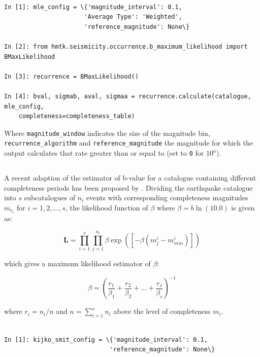 \begin{Verbatim}[frame=single, commandchars=\\\{\}, fontsize=\scriptsize]

In [1]: mle_config = \{'magnitude_interval': 0.1,
                      'Average Type': 'Weighted',
                      'reference_magnitude': None\}

In [2]: from hmtk.seismicity.occurrence.b_maximum_likelihood import BMaxLikelihood

In [3]: recurrence = BMaxLikelihood()

In [4]: bval, sigmab, aval, sigmaa = recurrence.calculate(catalogue, mle_config, 
    completeness=completeness_table)

\end{Verbatim}

Where \verb=magnitude_window= indicates the size of the magnitude bin, \verb=recurrence_algorithm= and \verb=reference_magnitude= the magnitude for which the output calculates that rate greater than or equal to (set to \verb=0= for $10^{a}$). 

\subsection{\cite{KijkoSmit2012}}

A recent adaption of the \cite{Aki1965} estimator of b-value for  a catalogue containing different completeness periods has been proposed by \cite{KijkoSmit2012}. Dividing the earthquake catalogue into $s$ subcatalogues of $n_i$ events with corresponding completeness magnitudes $m_{c_i}$ for $i = 1, 2, ..., s$, the likelihood function of $\beta$ where $\beta = b \ln		 \left( {10.0} \right)$ is given as:

\begin{equation}
    \mathbf{L} = \prod_{i = 1}^{s} \prod_{j = 1}^{n_i} \beta \exp(\left[ {-\beta \left( {m_j^i - m_{min}^i } \right) } \right])
\end{equation}

which gives a maximum likelihood estimator of $\beta$:

\begin{equation}
    \beta = \left( {\frac{r_1}{\beta_1} + \frac{r_2}{\beta_2} + \dots + \frac{r_s}{\beta_s}} \right)^{-1}
\end{equation}

where $r_i = n_i / n$ and $n = \sum_{i = 1}^{s} n_i$ above the level of completeness $m_i$.

\begin{Verbatim}[frame=single, commandchars=\\\{\}, fontsize=\scriptsize]

In [1]: kijko_smit_config = \{'magnitude_interval': 0.1,
                             'reference_magnitude': None\}

\end{Verbatim}

